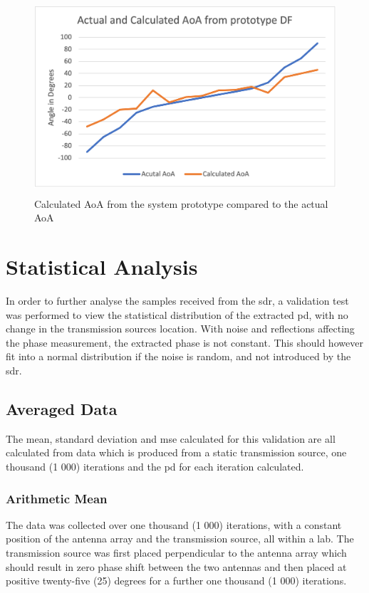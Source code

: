 \documentclass[class=report,11pt,crop=false]{standalone}
\begin{document}
\begin{figure}[h]
    \centering
    \includegraphics[width=13cm,height=7.2cm]{Images/plots/AoA-prototype.png}
    \caption{Calculated AoA from the system prototype compared to the actual AoA}
    \label{fig:average-phase}
\end{figure}

\section{Statistical Analysis \label{sec:results-stats}}
In order to further analyse the samples received from the \gls{sdr}, a validation test was performed to view the statistical distribution of the extracted \gls{pd}, with no change in the transmission sources location. With noise and reflections affecting the phase measurement, the extracted phase is not constant. This should however fit into a normal distribution if the noise is random, and not introduced by the \gls{sdr}.

\subsection{Averaged Data}
The mean, standard deviation and \gls{mse} calculated for this validation are all calculated from data which is produced from a static transmission source, one thousand (1 000) iterations and the \gls{pd} for each iteration calculated. 

\subsubsection{Arithmetic Mean}
The data was collected over one thousand (1 000) iterations, with a constant position of the antenna array and the transmission source, all within a lab. The transmission source was first placed perpendicular to the antenna array which should result in zero phase shift between the two antennas and then placed at positive twenty-five (25) degrees for a further one thousand (1 000) iterations.
\end{document}
